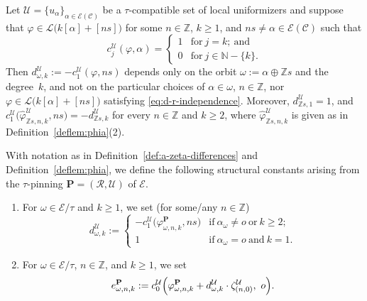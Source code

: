 \documentclass[10pt,a4paper]{amsart}
\newcommand{\Ca}{\mathcal{C}} %
\newcommand{\Z}{\mathbb{Z}} %
\newcommand{\ec}{\mathcal{E}} %
\newcommand{\idec}{{o}} %
\newcommand{\orbita}{{\ec/\tau}} %
\newcommand{\za}[2]{\zeta^{\mathcal{U}}_{( {#1} , {#2} )}}
\begin{document}
\begin{lemma}\label{lem:d-r-independence} Let $\mathcal{U}=\{u_\alpha\}_{\alpha\in\ec(\Ca)}$ be a $\tau$-compatible set of local uniformizers and suppose that $\varphi\in\mathcal{L}\bigl(k[\alpha]+[ns]\bigr)$ for some $n\in\Z$, $k\geq 1$, and $ns\neq\alpha\in\ec(\Ca)$ such that \begin{equation}\label{eq:d-r-independence}c_j^\mathcal{U}(\varphi,\alpha)=\begin{cases} 1 & \text{for} \ j=k; \ \text{and} \\0 & \text{for} \ j\in\mathbb{N}-\{ k\}.\end{cases}\end{equation} Then $d^\mathcal{U}_{\omega,k}:=-c_1^\mathcal{U}(\varphi,ns)$ depends only on the orbit $\omega:=\alpha\oplus \Z s$ and the degree~$k$, and not on the particular choices of $\alpha\in\omega$, $n\in\Z$, nor $\varphi\in\mathcal{L}\bigl(k[\alpha]+[ns]\bigr)$ satisfying \eqref{eq:d-r-independence}. Moreover, $d^\mathcal{U}_{\Z s,1}=1$, and $c_1^\mathcal{U}\bigl(\hat{\varphi}^\mathcal{U}_{\Z s,n,k},ns\bigr)=-d^\mathcal{U}_{\Z s, k}$ for every $n\in\Z$ and $k\geq 2$, where $\hat{\varphi}^\mathcal{U}_{\Z s, n, k}$ is given as in Definition~\ref{deflem:phia}(2).
\end{lemma}

\begin{definition} \label{def:structural-constants}
    With notation as in Definition~\ref{def:a-zeta-differences} and Definition~\ref{deflem:phia}, we define the following structural constants arising from the $\tau$-pinning $\mathbf{P}=(\mathcal{R},\mathcal{U})$ of $\ec$.
     \begin{enumerate}
        \item For $\omega\in\orbita$ and $k\geq 1$, we set (for some/any $n\in\Z$) \[d_{\omega,k}^{\mathcal{U}}:=\begin{cases}
        -c_1^\mathcal{U}\bigl(\varphi^\mathbf{P}_{\omega,n,k},ns\bigr) & \text{if} \ \alpha_{\omega}\neq\idec \ \text{or} \ k\geq 2;\\
            1 & \text{if} \ \alpha_{\omega}=\idec \ \text{and} \ k=1.
        \end{cases}\]
        \item For $\omega\in\orbita$, $n\in \Z$, and $k\geq 1$, we set \[e^\mathbf{P}_{\omega,n,k}:=c_0^\mathcal{U}\Bigl(\varphi^\mathbf{P}_{\omega,n,k} + d^\mathcal{U}_{\omega,k}\cdot\za{n}{0},\ \idec\Bigr).\]
    \end{enumerate}
\end{definition}
\end{document}
